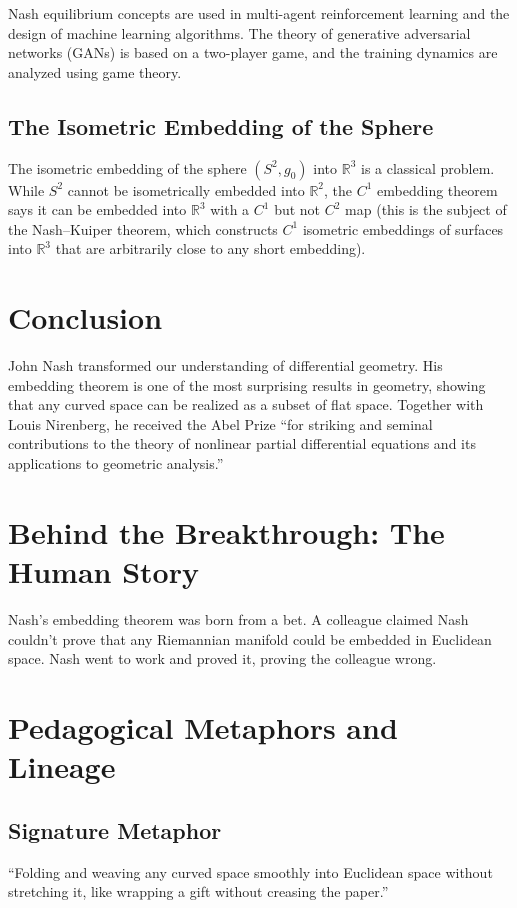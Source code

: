 Nash equilibrium concepts are used in multi-agent reinforcement learning and the design of machine learning algorithms. The theory of generative adversarial networks (GANs) is based on a two-player game, and the training dynamics are analyzed using game theory.

\subsection{The Isometric Embedding of the Sphere}

The isometric embedding of the sphere $(S^2, g_0)$ into $\mathbb{R}^3$ is a classical problem. While $S^2$ cannot be isometrically embedded into $\mathbb{R}^2$, the $C^1$ embedding theorem says it can be embedded into $\mathbb{R}^3$ with a $C^1$ but not $C^2$ map (this is the subject of the Nash--Kuiper theorem, which constructs $C^1$ isometric embeddings of surfaces into $\mathbb{R}^3$ that are arbitrarily close to any short embedding).

\section{Conclusion}

John Nash transformed our understanding of differential geometry. His embedding theorem is one of the most surprising results in geometry, showing that any curved space can be realized as a subset of flat space. Together with Louis Nirenberg, he received the Abel Prize ``for striking and seminal contributions to the theory of nonlinear partial differential equations and its applications to geometric analysis.''

\section{Behind the Breakthrough: The Human Story}
Nash's embedding theorem was born from a bet. A colleague claimed Nash couldn't prove that any Riemannian manifold could be embedded in Euclidean space. Nash went to work and proved it, proving the colleague wrong.

\section{Pedagogical Metaphors and Lineage}
\subsection{Signature Metaphor}
``Folding and weaving any curved space smoothly into Euclidean space without stretching it, like wrapping a gift without creasing the paper.''

